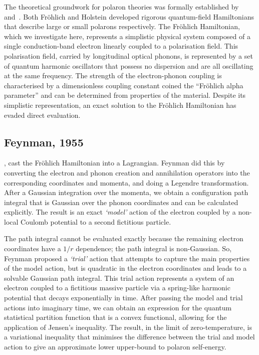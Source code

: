 The theoretical groundwork for polaron theories was formally established by~\cite{frohlich_electrons_1954} and~\cite{holstein_studies_1959-1, holstein_studies_1959}. Both Fr\"ohlich and Holstein developed rigorous quantum-field Hamiltonians that describe large or small polarons respectively. The Fr\"ohlich Hamiltonian, which we investigate here, represents a simplistic physical system composed of a single conduction-band electron linearly coupled to a polarisation field. This polarisation field, carried by longitudinal optical phonons, is represented by a set of quantum harmonic oscillators that possess no dispersion and are all oscillating at the same frequency. The strength of the electron-phonon coupling is characterised by a dimensionless coupling constant coined the ``Fr\"ohlich alpha parameter'' and can be determined from properties of the material. Despite its simplistic representation, an exact solution to the Fr\"ohlich Hamiltonian has evaded direct evaluation.

\subsection{Feynman, 1955}

\cite{feynman_slow_1955}, cast the Fr\"ohlich Hamiltonian into a Lagrangian. Feynman did this by converting the electron and phonon creation and annihilation operators into the corresponding coordinates and momenta, and doing a Legendre transformation. After a Gaussian integration over the momenta, we obtain a configuration path integral that is Gaussian over the phonon coordinates and can be calculated explicitly. The result is an exact \emph{`model'} action of the electron coupled by a non-local Coulomb potential to a second fictitious particle. 

The path integral cannot be evaluated exactly because the remaining electron coordinates have a $1 / r$ dependence; the path integral is non-Gaussian. So, Feynman proposed a \emph{`trial'} action that attempts to capture the main properties of the model action, but is quadratic in the electron coordinates and leads to a solvable Gaussian path integral. This trial action represents a system of an electron coupled to a fictitious massive particle via a spring-like harmonic potential that decays exponentially in time. After passing the model and trial actions into imaginary time, we can obtain an expression for the quantum statistical partition function that is a convex functional, allowing for the application of Jensen's inequality. The result, in the limit of zero-temperature, is a variational inequality that minimises the difference between the trial and model action to give an approximate lower upper-bound to polaron self-energy.

